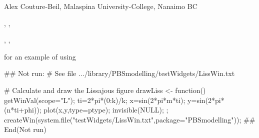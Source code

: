\documentclass[letterpaper]{book}
\begin{document}
\begin{Author}\relax
Alex Couture-Beil, Malaspina University-College, Nanaimo BC
\end{Author}
\begin{SeeAlso}\relax
{}, , 

, , 

 for an example of using 
\end{SeeAlso}
\begin{Examples}
\begin{ExampleCode}
## Not run: 
# See file .../library/PBSmodelling/testWidgets/LissWin.txt

# Calculate and draw the Lissajous figure
drawLiss <- function() {
   getWinVal(scope="L"); ti=2*pi*(0:k)/k;
   x=sin(2*pi*m*ti);     y=sin(2*pi*(n*ti+phi));
   plot(x,y,type=ptype); invisible(NULL); };
createWin(system.file("testWidgets/LissWin.txt",package="PBSmodelling"));
## End(Not run)
\end{ExampleCode}
\end{Examples}
\end{document}
